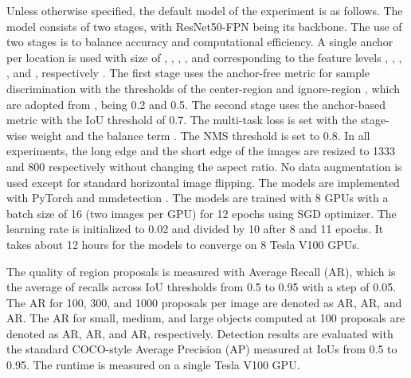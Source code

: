 \documentclass{article}
\begin{document}
	Unless otherwise specified, the default model of the experiment is as follows. The model consists of two stages, with ResNet50-FPN \citep{Lin_2017_CVPR} being its backbone. The use of two stages is to balance accuracy and computational efficiency. A single anchor per location is used with size of , , , , and  corresponding to the feature levels , , , , and , respectively \citep{Lin_2017_CVPR}. The first stage uses the anchor-free metric for sample discrimination with the thresholds of the center-region  and ignore-region , which are adopted from \citep{unitbox,wang2019region}, being 0.2 and 0.5. The second stage uses the anchor-based metric with the IoU threshold of 0.7. The multi-task loss is set with the stage-wise weight  and the balance term . The NMS threshold is set to 0.8. In all experiments, the long edge and the short edge of the images are resized to 1333 and 800 respectively without changing the aspect ratio. No data augmentation is used except for standard horizontal image flipping. The models are implemented with PyTorch \citep{paszke2017automatic} and mmdetection \citep{mmdetection2018}. The models are trained with 8 GPUs with a batch size of 16 (two images per GPU) for 12 epochs using SGD optimizer. The learning rate is initialized to 0.02 and divided by 10 after 8 and 11 epochs. It takes about 12 hours for the models to converge on 8 Tesla V100 GPUs.
	
	The quality of region proposals is measured with Average Recall (AR), which is the average of recalls across IoU thresholds from 0.5 to 0.95 with a step of 0.05. The AR for 100, 300, and 1000 proposals per image are denoted as AR, AR, and AR. The AR for small, medium, and large objects computed at 100 proposals are denoted as AR, AR, and AR, respectively. Detection results are evaluated with the standard COCO-style Average Precision (AP) measured at IoUs from 0.5 to 0.95. The runtime is measured on a single Tesla V100 GPU.
	
	
\end{document}

